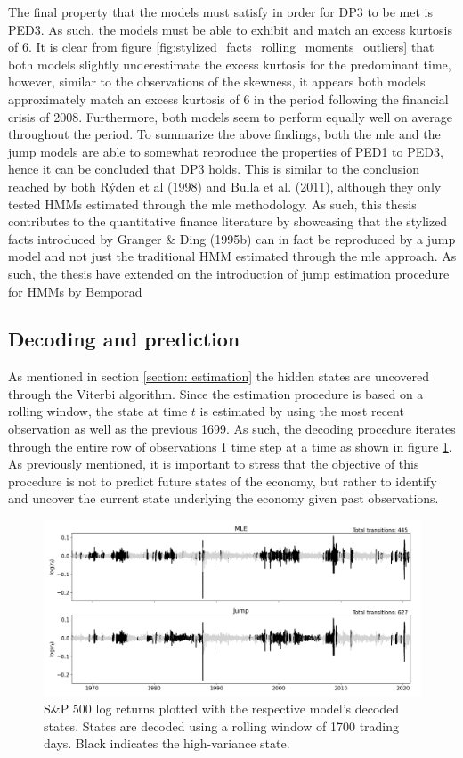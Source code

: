 The final property that the models must satisfy in order for DP3 to be met is PED3. As such, the models must be able to exhibit and match an excess kurtosis of 6. It is clear from figure \ref{fig:stylized_facts_rolling_moments_outliers} that both models slightly underestimate the excess kurtosis for the predominant time, however, similar to the observations of the skewness, it appears both models approximately match an excess kurtosis of 6 in the period following the financial crisis of 2008. Furthermore, both models seem to perform equally well on average throughout the period. To summarize the above findings, both the mle and the jump models are able to somewhat reproduce the properties of PED1 to PED3, hence it can be concluded that DP3 holds. This is similar to the conclusion reached by both Rýden et al (1998) and Bulla et al. (2011), although they only tested HMMs estimated through the mle methodology. As such, this thesis contributes to the quantitative finance literature by showcasing that the stylized facts introduced by Granger \& Ding (1995b) can in fact be reproduced by a jump model and not just the traditional HMM estimated through the mle approach. As such, the thesis have extended on the introduction of jump estimation procedure for HMMs by Bemporad 

\subsection{Decoding and prediction}
As mentioned in section \ref{section: estimation} the hidden states are uncovered through the Viterbi algorithm. Since the estimation procedure is based on a rolling window, the state at time $t$ is estimated by using the most recent observation as well as the previous 1699. As such, the decoding procedure iterates through the entire row of observations 1 time step at a time as shown in figure \ref{fig:stylized_facts_decoded_states}. As previously mentioned, it is important to stress that the objective of this procedure is not to predict future states of the economy, but rather to identify and uncover the current state underlying the economy given past observations. 

\begin{figure}[H] 
    \centering
    \includegraphics[width=1.0\textwidth]{analysis/stylized_facts/images/decoded_states.png}
    \caption{S\&P 500 log returns plotted with the respective model's decoded states. States are decoded using a rolling window of 1700 trading days. Black indicates the high-variance state.}
    \label{fig:stylized_facts_decoded_states} 
\end{figure}

